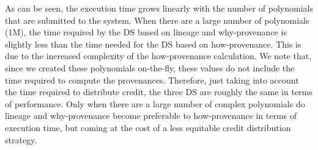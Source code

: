 {
As can be seen, the execution time grows linearly with the number of polynomials that are submitted to the system. When there are a large number of polynomials (1M), the time required by the DS based on lineage and why-provenance is slightly less than the time needed for the DS based on how-provenance. This is due to the increased complexity of the how-provenance calculation.  
We note that, since we created these polynomials on-the-fly, these values do not include the time required to compute the provenances.
Therefore, just taking into account the time required to distribute credit, the three DS are roughly the same in terms of performance. 
Only when there are a large number of complex polynomials do lineage and why-provenance  become preferable to how-provenance in terms of execution time, but coming at the cost of a less equitable credit distribution strategy.
}


%
%
%
% 
